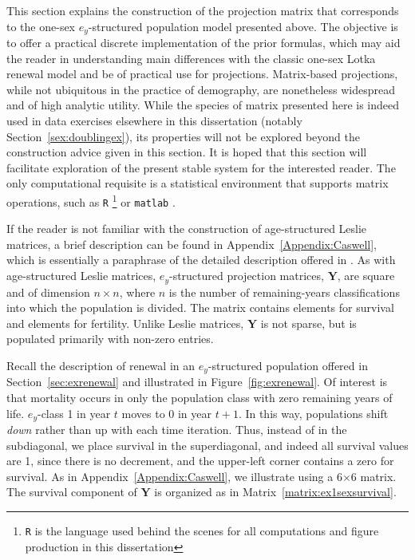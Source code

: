  \FloatBarrier
\label{sec:ex1sexleslie}
This section explains the construction of the projection matrix that corresponds
to the one-sex $e_y$-structured population model presented above. The objective is
to offer a practical discrete implementation of the prior
formulas, which may aid the reader in understanding main differences with the
classic one-sex Lotka renewal model and be of practical use for projections.
Matrix-based projections, while not ubiquitous in the practice of demography,
are nonetheless widespread and of high analytic utility. While the species of
matrix presented here is indeed used in data exercises elsewhere in this
dissertation (notably Section~\ref{sex:doublingex}), its properties will not be
explored beyond the construction advice given in this section. It is hoped that
this section will facilitate exploration of the present stable system for
the interested reader. The only computational requisite is a statistical
environment that supports matrix operations, such as
\texttt{R} \citep{Rcitation}\footnote{\texttt{R} is the language used behind the
scenes for all computations and figure production in this dissertation} or
\texttt{matlab} \citep{MATLAB:2010}.

If the reader is not familiar with the construction
of age-structured Leslie matrices, a brief description can be found in
Appendix~\ref{Appendix:Caswell}, which is essentially a paraphrase of the
detailed description offered in \cite{caswell2001matrix}. As with
age-structured Leslie matrices, $e_y$-structured projection matrices,
$\textbf{Y}$, are square and of dimension $n \times n$, where $n$ is the number
of remaining-years classifications into which the population is divided. The matrix contains
elements for survival and elements for fertility. Unlike Leslie matrices,
$\textbf{Y}$ is not sparse, but is populated primarily with non-zero entries.

Recall the description of renewal in an $e_y$-structured population offered in
Section~\ref{sec:exrenewal} and illustrated in Figure~\ref{fig:exrenewal}. Of
interest is that mortality occurs in only the population class with zero
remaining years of life. $e_y$-class 1 in year $t$ moves to 0 in year $t+1$.
In this way, populations shift \textit{down} rather than up with each time iteration.
Thus, instead of in the subdiagonal, we place survival in the superdiagonal, and
indeed all survival values are 1, since there is no decrement, and the
upper-left corner contains a zero for survival. As in
Appendix~\ref{Appendix:Caswell}, we illustrate using a 6$\times$6 matrix. The
survival component of $\textbf{Y}$ is organized as in
Matrix~\ref{matrix:ex1sexsurvival}.

